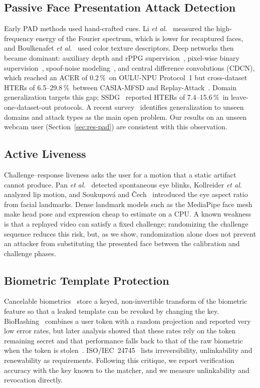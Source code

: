 \documentclass{ieeeaccess}
\newcommand{\pct}{\,\%}
\begin{document}
\subsection{Passive Face Presentation Attack Detection}
Early PAD methods used hand-crafted cues. Li \emph{et al.}~\cite{li2004} measured the high-frequency
energy of the Fourier spectrum, which is lower for recaptured faces, and Boulkenafet
\emph{et al.}~\cite{boulkenafet2016} used color texture descriptors. Deep networks then became dominant:
auxiliary depth and rPPG supervision~\cite{liu2018}, pixel-wise binary supervision~\cite{deeppixbis},
spoof-noise modeling~\cite{facedes}, and central difference convolutions (CDCN), which reached an ACER
of 0.2\pct\ on OULU-NPU Protocol~1 but cross-dataset HTERs of 6.5--29.8\pct\ between CASIA-MFSD and
Replay-Attack~\cite{cdcn}. Domain generalization targets this gap; SSDG~\cite{ssdg} reported HTERs of
7.4--15.6\pct\ in leave-one-dataset-out protocols. A recent survey~\cite{fas_survey} identifies
generalization to unseen domains and attack types as the main open problem. Our results on an unseen
webcam user (Section~\ref{sec:res-pad}) are consistent with this observation.

\subsection{Active Liveness}
Challenge--response liveness asks the user for a motion that a static artifact cannot produce. Pan
\emph{et al.}~\cite{pan2007} detected spontaneous eye blinks, Kollreider
\emph{et al.}~\cite{kollreider2007} analyzed lip motion, and Soukupov\'{a} and \v{C}ech~\cite{ear2016}
introduced the eye aspect ratio from facial landmarks. Dense landmark models such as the MediaPipe face
mesh~\cite{kartynnik2019} make head pose and expression cheap to estimate on a CPU. A known weakness is
that a replayed video can satisfy a fixed challenge; randomizing the challenge sequence reduces this
risk, but, as we show, randomization alone does not prevent an attacker from substituting the presented
face between the calibration and challenge phases.

\subsection{Biometric Template Protection}
Cancelable biometrics~\cite{ratha2001} store a keyed, non-invertible transform of the biometric
feature so that a leaked template can be revoked by changing the key. BioHashing~\cite{biohashing}
combines a user token with a random projection and reported very low error rates, but later analysis
showed that these rates rely on the token remaining secret and that performance falls back to that of
the raw biometric when the token is stolen~\cite{kong2006}. ISO/IEC~24745~\cite{iso24745} lists
irreversibility, unlinkability and renewability as requirements. Following this critique, we report
verification accuracy with the key known to the matcher, and we measure unlinkability and revocation
directly.
\end{document}
